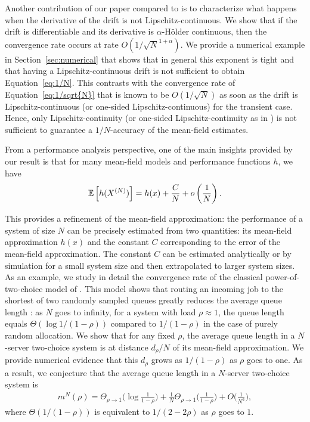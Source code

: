 \documentclass[acmlarge]{acmart}
\newcommand\XN{X^{(N)}}
\newcommand\esp[1]{{\mathchoice{\besp{#1}}{\sesp{#1}}{\sesp{#1}}{\sesp{#1}}}}
\newcommand\besp[1]{\mathbb{E}\left[#1\right]}
\newcommand\sesp[1]{\mathbb{E}[#1]}
\newcommand\p[1]{\left(#1\right)}
\begin{document}
Another contribution of our paper compared to
\cite{kolokoltsov2011mean,ying2016rate} is to characterize what
happens when the derivative of the drift is not
Lipschitz-continuous.  We show that if the drift is differentiable and
its derivative is $\alpha$-Hölder continuous, then the convergence
rate occurs at rate $O(1/\sqrt{N}^{1+\alpha})$.  We provide a
numerical example in Section~\ref{sec:numerical} that shows that in
general this exponent is tight and that having a Lipschitz-continuous
drift is not sufficient to obtain Equation~\eqref{eq:1/N}. This
contrasts with the convergence rate of Equation~\eqref{eq:1/sqrt{N}}
that is known to be $O(1/\sqrt{N})$ as soon as the drift is
Lipschitz-continuous (or one-sided Lipschitz-continuous) for the
transient case.  Hence, only Lipschitz-continuity (or one-sided
Lipschitz-continuity as in \cite{gast2012markov,tsitsiklis2011power})
is not sufficient to guarantee a $1/N$-accuracy of the mean-field
estimates.

From a performance analysis perspective, one of the main insights
provided by our result is that for many mean-field models and
performance functions $h$, we have
\begin{align}
  \label{eq:C/N}
  \esp{h(\XN)} = h(x)+\frac{C}{N} + o\p{\frac1N}.
\end{align}

This provides a refinement of the mean-field approximation: the
performance of a system of size $N$ can be precisely estimated from
two quantities: its mean-field approximation $h(x)$ and the constant
$C$ corresponding to the error of the mean-field approximation. The
constant $C$ can be estimated analytically or by simulation for a
small system size and then extrapolated to larger system sizes.  As an
example, we study in detail the convergence rate of the classical
power-of-two-choice model of
\cite{mitzenmacher1996power,vvedenskaya1996queueing}. This model shows
that routing an incoming job to the shortest of two randomly sampled
queues greatly reduces the average queue length : as $N$ goes to
infinity, for a system with load $\rho\approx1$, the queue length
equals $\Theta(\log 1/(1-\rho))$ compared to $1/(1-\rho)$ in the case
of purely random allocation. We show that for any fixed $\rho$, the
average queue length in a $N$-server two-choice system is at distance
$d_\rho/N$ of its mean-field approximation. We provide numerical
evidence that this $d_\rho$ grows as $1/(1-\rho)$ as $\rho$ goes to
one. As a result, we conjecture that the average queue length in a
$N$-server two-choice system is 
\begin{align*}
  m^N(\rho) = \Theta_{\rho\to1}\Big(\log\frac1{1-\rho}\Big)
  + \frac{1}{N}\Theta_{\rho\to1}\Big(\frac{1}{1-\rho}\Big) +
  O\Big(\frac1{N^2}\Big),
\end{align*}
where $\Theta(1/(1-\rho))$ is equivalent to $1/(2-2\rho)$ as $\rho$
goes to $1$.
\end{document}
